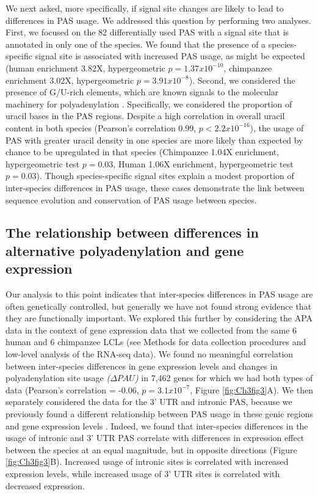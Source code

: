 We next asked, more specifically, if signal site changes are likely to lead to differences in PAS usage. We addressed this question by performing two analyses. First, we focused on the 82 differentially used PAS with a signal site that is annotated in only one of the species. We found that the presence of a species-specific signal site is associated with increased PAS usage, as might be expected (human enrichment 3.82X, hypergeometric $p=1.37x10^{-10}$, chimpanzee enrichment 3.02X, hypergeometric $p=3.91x10^{-8}$). Second, we considered the presence of G/U-rich elements, which are known signals to the molecular machinery for polyadenylation \citep{colgan_mechanism_1997}. Specifically, we considered the proportion of uracil bases in the PAS regions. Despite a high correlation in overall uracil content in both species (Pearson's correlation 0.99, $p<2.2x10^{-16}$), the usage of PAS with greater uracil density in one species are more likely than expected by chance to be upregulated in that species (Chimpanzee 1.04X enrichment, hypergeometric test $p=0.03$, Human 1.06X enrichment, hypergeometric test $p=0.03$). Though species-specific signal sites explain a modest proportion of inter-species differences in PAS usage, these cases demonstrate the link between sequence evolution and conservation of PAS usage between species. 


\subsection{The relationship between differences in alternative polyadenylation and gene expression}\label{dAPADE}

Our analysis to this point indicates that inter-species differences in PAS usage are often genetically controlled, but generally we have not found strong evidence that they are functionally important. We explored this further by considering the APA data in the context of gene expression data that we collected from the same 6 human and 6 chimpanzee LCLs (see Methods for data collection procedures and low-level analysis of the RNA-seq data). We found no meaningful correlation between inter-species differences in gene expression levels and changes in polyadenylation site usage \emph{($\Delta PAU$)} in 7,462 genes for which we had both types of data (Pearson's correlation = -0.06, $p=3.1x10^{-7}$, Figure \ref{fig:Ch3fig3}A). We then separately considered the data for the 3' UTR and intronic PAS, because we previously found a different relationship between PAS usage in these genic regions and gene expression levels \citep{mittleman_alternative_2020}. Indeed, we found that inter-species differences in the usage of intronic and 3' UTR PAS correlate with differences in expression effect between the species at an equal magnitude, but in opposite directions (Figure \ref{fig:Ch3fig3}B). Increased usage of intronic sites is correlated with increased expression levels, while increased usage of 3' UTR sites is correlated with decreased expression. 


